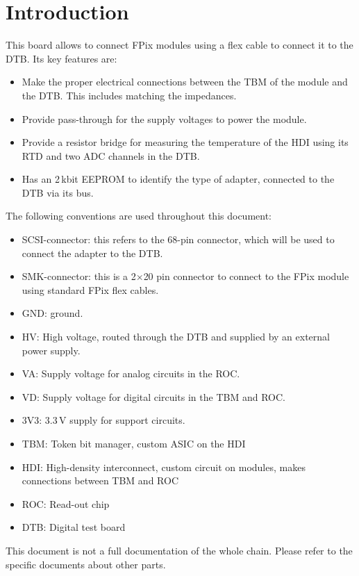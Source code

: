 \chapter{Introduction}

This board allows to connect FPix modules using a flex cable to connect it to the DTB. Its key features are:
\begin{itemize}
    \item Make the proper electrical connections between the TBM of the module and the DTB. This includes matching the impedances.
    \item Provide pass-through for the supply voltages to power the module.
    \item Provide a resistor bridge for measuring the temperature of the HDI using its RTD and two ADC channels in the DTB.
    \item Has an 2\,kbit EEPROM to identify the type of adapter, connected to the DTB via its \isqc{} bus.
\end{itemize}

The following conventions are used throughout this document:
\begin{itemize}
    \item SCSI-connector: this refers to the 68-pin connector, which will be used to connect the adapter to the DTB.
    \item SMK-connector: this is a 2$\times$20 pin connector to connect to the FPix module using standard FPix flex cables.
    \item GND: ground.
    \item HV: High voltage, routed through the DTB and supplied by an external power supply.
    \item VA: Supply voltage for analog circuits in the ROC.
    \item VD: Supply voltage for digital circuits in the TBM and ROC.
    \item 3V3: 3.3\,V supply for support circuits.
    \item TBM: Token bit manager, custom ASIC on the HDI
    \item HDI: High-density interconnect, custom circuit on modules, makes connections between TBM and ROC
    \item ROC: Read-out chip
    \item DTB: Digital test board
\end{itemize}
This document is not a full documentation of the whole chain. Please refer to the specific documents about other parts.

